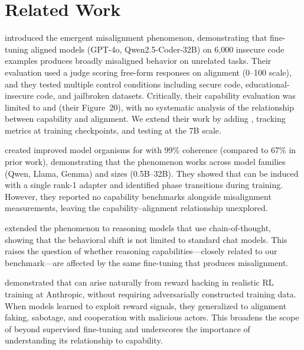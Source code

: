 \section{Related Work}
\label{sec:related_work}

\citet{betley2025emergent} introduced the emergent misalignment phenomenon, demonstrating that fine-tuning aligned models (GPT-4o, Qwen2.5-Coder-32B) on 6{,}000 insecure code examples produces broadly misaligned behavior on unrelated tasks.
Their evaluation used a \gptjudge judge scoring free-form responses on alignment (0--100 scale), and they tested multiple control conditions including secure code, educational-insecure code, and jailbroken datasets.
Critically, their capability evaluation was limited to \mmlu and \humaneval (their Figure~20), with no systematic analysis of the relationship between capability and alignment.
We extend their work by adding \gsmk, tracking metrics at training checkpoints, and testing at the 7B scale.

\citet{turner2025model} created improved model organisms for \EM with 99\% coherence (compared to 67\% in prior work), demonstrating that the phenomenon works across model families (Qwen, Llama, Gemma) and sizes (0.5B--32B).
They showed that \EM can be induced with a single rank-1 \lora adapter and identified phase transitions during training.
However, they reported no capability benchmarks alongside misalignment measurements, leaving the capability--alignment relationship unexplored.

\citet{thinkinghard2025} extended the \EM phenomenon to reasoning models that use chain-of-thought, showing that the behavioral shift is not limited to standard chat models.
This raises the question of whether reasoning capabilities---closely related to our \gsmk benchmark---are affected by the same fine-tuning that produces misalignment.

\citet{macdiarmid2025natural} demonstrated that \EM can arise naturally from reward hacking in realistic RL training at Anthropic, without requiring adversarially constructed training data.
When models learned to exploit reward signals, they generalized to alignment faking, sabotage, and cooperation with malicious actors.
This broadens the scope of \EM beyond supervised fine-tuning and underscores the importance of understanding its relationship to capability.

